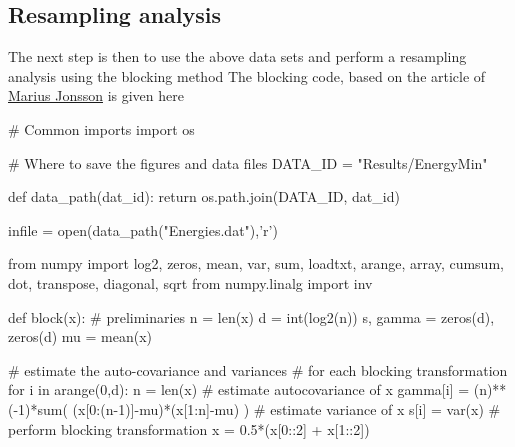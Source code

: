 \documentclass[%
oneside,                 %
final,                   %
10pt]{article}
\begin{document}
\epycod


\subsection{Resampling analysis}

The next step is then to use the above data sets and perform a
resampling analysis using the blocking method
The blocking code, based on the article of \href{{https://journals.aps.org/pre/abstract/10.1103/PhysRevE.98.043304}}{Marius Jonsson} is given here


























































\bpycod
# Common imports
import os

# Where to save the figures and data files
DATA_ID = "Results/EnergyMin"

def data_path(dat_id):
    return os.path.join(DATA_ID, dat_id)

infile = open(data_path("Energies.dat"),'r')

from numpy import log2, zeros, mean, var, sum, loadtxt, arange, array, cumsum, dot, transpose, diagonal, sqrt
from numpy.linalg import inv

def block(x):
    # preliminaries
    n = len(x)
    d = int(log2(n))
    s, gamma = zeros(d), zeros(d)
    mu = mean(x)

    # estimate the auto-covariance and variances 
    # for each blocking transformation
    for i in arange(0,d):
        n = len(x)
        # estimate autocovariance of x
        gamma[i] = (n)**(-1)*sum( (x[0:(n-1)]-mu)*(x[1:n]-mu) )
        # estimate variance of x
        s[i] = var(x)
        # perform blocking transformation
        x = 0.5*(x[0::2] + x[1::2])
   
\end{document}
